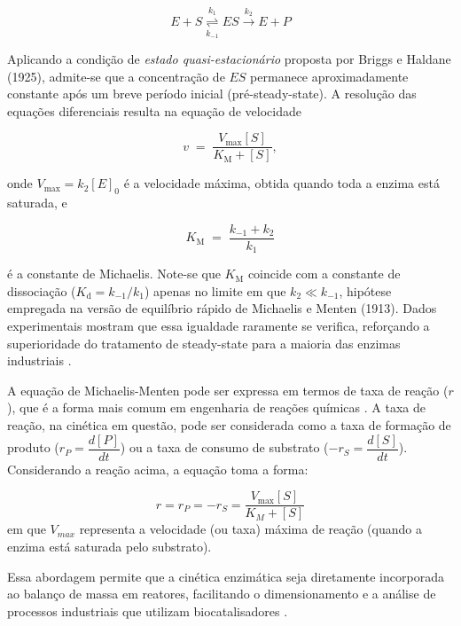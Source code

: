 \documentclass[12pt,oneside]{report}
\begin{document}
\begin{equation}
    \label{eq:MM-mecanismo}
    E + S \overset{k_1}{\underset{k_{-1}}{\rightleftharpoons}} ES \xrightarrow{k_2} E + P
\end{equation}

Aplicando a condição de \emph{estado quasi-estacionário} proposta por Briggs e Haldane (1925), admite-se que a concentração de $ES$ permanece aproximadamente constante após um breve período inicial (pré-steady-state). A resolução das equações diferenciais resulta na equação de velocidade

\begin{equation}
    \label{eq:MM-equacao}
    v \;=\; \frac{V_{\mathrm{max}}[S]}{K_\mathrm{M} + [S]},
\end{equation}

onde $V_{\mathrm{max}} = k_{2}[E]_0$ é a velocidade máxima, obtida quando toda a enzima está saturada, e

\[
    K_\mathrm{M} \;=\; \frac{k_{-1}+k_{2}}{k_{1}}
\]

é a constante de Michaelis. Note-se que $K_\mathrm{M}$ coincide com a constante de dissociação ($K_\mathrm{d} = k_{-1}/k_{1}$) apenas no limite em que $k_{2}\!\ll\!k_{-1}$, hipótese empregada na versão de equilíbrio rápido de Michaelis e Menten (1913). Dados experimentais mostram que essa igualdade raramente se verifica, reforçando a superioridade do tratamento de steady-state para a maioria das enzimas industriais \cite{bisswanger2017}.

A equação de Michaelis-Menten pode ser expressa em termos de taxa de reação ($r$), que é a forma mais comum em engenharia de reações químicas \cite{FOGLER_2016}. A taxa de reação, na cinética em questão, pode ser considerada como a taxa de formação de produto ($r_P = \dfrac{d[P]}{dt}$) ou a taxa de consumo de substrato ($-r_S = \dfrac{d[S]}{dt}$). Considerando a reação acima, a equação toma a forma:

\begin{equation}
    r = r_P = -r_S = \frac{V_{\text{max}} [S]}{K_M + [S]}
\end{equation}
em que $V_{max}$ representa a velocidade (ou taxa) máxima de reação (quando a enzima está saturada pelo substrato).

Essa abordagem permite que a cinética enzimática seja diretamente incorporada ao balanço de massa em reatores, facilitando o dimensionamento e a análise de processos industriais que utilizam biocatalisadores \cite{FOGLER_2016}.
\end{document}

